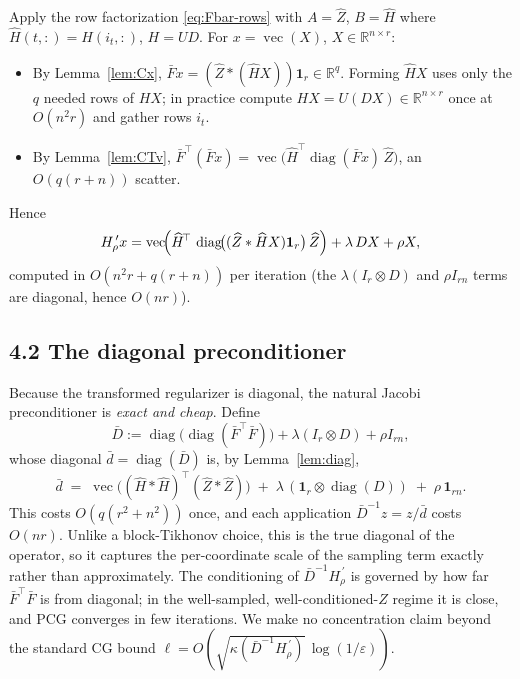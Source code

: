 \documentclass[11pt]{article}
\newcommand{\R}{\mathbb{R}}
\newcommand{\vecop}{\operatorname{vec}}
\newcommand{\diag}{\operatorname{diag}}
\newcommand{\had}{\ast}            %
\newcommand{\bF}{\bar F}
\newcommand{\bD}{\bar D}
\newcommand{\bd}{\bar d}
\begin{document}
Apply the row factorization \eqref{eq:Fbar-rows} with $A=\widehat Z$,
$B=\widehat H$ where $\widehat H(t,:)=H(i_t,:)$, $H=UD$. For
$x=\vecop(X)$, $X\in\R^{n\times r}$:
\begin{itemize}\setlength\itemsep{2pt}
\item By Lemma~\ref{lem:Cx}, $\bF x=(\widehat Z\had(\widehat H X))\mathbf 1_r\in\R^q$.
      Forming $\widehat H X$ uses only the $q$ needed rows of $HX$; in practice
      compute $HX=U(DX)\in\R^{n\times r}$ once at $O(n^2r)$ and gather rows
      $i_t$.
\item By Lemma~\ref{lem:CTv}, $\bF^{\!\top}(\bF x)
      =\vecop\!\bigl(\widehat H^{\!\top}\diag(\bF x)\,\widehat Z\bigr)$,
      an $O(q(r+n))$ scatter.
\end{itemize}
Hence
\begin{equation}\label{eq:matvec}
  H_\rho^{\,\prime}x
   = \vecop\!\Bigl(\widehat H^{\!\top}\,\diag\!\bigl((\widehat Z\had \widehat H X)\mathbf 1_r\bigr)\,\widehat Z\Bigr)
     + \lambda\,DX + \rho X,
\end{equation}
computed in $O(n^2r+q(r+n))$ per iteration (the $\lambda(I_r\otimes D)$ and
$\rho I_{rn}$ terms are diagonal, hence $O(nr)$).

\subsection*{4.2 The diagonal preconditioner}

Because the transformed regularizer is diagonal, the natural Jacobi
preconditioner is \emph{exact and cheap}. Define
\[
  \bD := \diag\!\bigl(\diag(\bF^{\!\top}\bF)\bigr)+\lambda(I_r\otimes D)+\rho I_{rn},
\]
whose diagonal $\bd=\diag(\bD)$ is, by Lemma~\ref{lem:diag},
\begin{equation}\label{eq:precond}
  \bd \;=\; \vecop\!\bigl((\widehat H\had \widehat H)^{\!\top}(\widehat Z\had \widehat Z)\bigr)
        \;+\;\lambda\,(\mathbf 1_r\otimes\diag(D))\;+\;\rho\,\mathbf 1_{rn}.
\end{equation}
This costs $O(q(r^2+n^2))$ once, and each application
$\bD^{-1}z=z/\bd$ costs $O(nr)$. Unlike a block-Tikhonov choice, this is the
true diagonal of the operator, so it captures the per-coordinate scale of the
sampling term exactly rather than approximately. The conditioning of
$\bD^{-1}H_\rho^{\,\prime}$ is governed by how far $\bF^{\!\top}\bF$ is from
diagonal; in the well-sampled, well-conditioned-$Z$ regime it is close, and
PCG converges in few iterations. We make no concentration claim beyond the
standard CG bound $\ell=O(\sqrt{\kappa(\bD^{-1}H_\rho^{\,\prime})}\,\log(1/\varepsilon))$.
\end{document}
